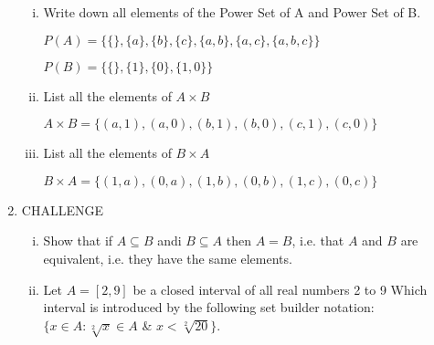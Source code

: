 \documentclass[]{article}
\begin{document}
\begin{enumerate}
    \begin{enumerate}[i.]
        \item Write down all elements of the Power Set of A and Power Set of B.
            
            $P(A)= \{\{ \}, \{a\}, \{b\}, \{c\}, \{a, b\}, \{a, c\}, \{a, b, c\} \}$

            $P(B)= \{ \{ \}, \{1\}, \{0\}, \{1, 0\} \}$

        \item List all the elements of $A \times B$

            $A \times B = \{ (a, 1), (a, 0), (b, 1), (b, 0), (c, 1), (c, 0) \}$

        \item List all the elements of $B \times A$

            $B \times A = \{ (1, a), (0, a), (1, b), (0, b), (1, c), (0, c) \}$

    \end{enumerate}
\item CHALLENGE

    \begin{enumerate}[i.]
        \item Show that if $A \subseteq B$ andi $ B \subseteq A$ then $ A = B$, i.e. that $A$ and $B$ are equivalent, i.e. they have the same elements.
        \item Let $A = [2,9]$ be a closed interval of all real numbers 2 to 9 Which interval is introduced by the following set builder notation:$ \{x\in A : \sqrt[2]{x} \in A$ \& $ x < \sqrt[2]{20} \}$.
    \end{enumerate}

\end{enumerate}
\end{document}
